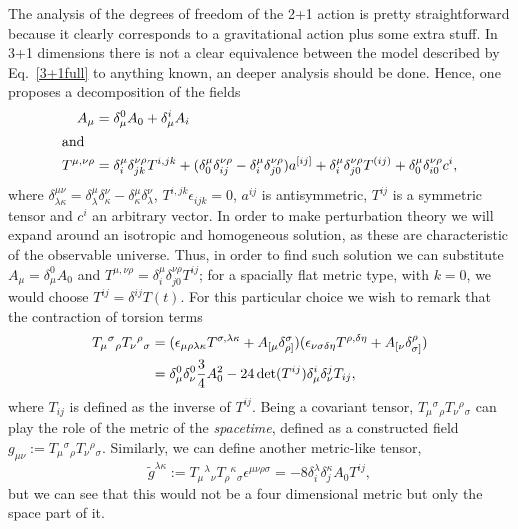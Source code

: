 \documentclass[%
  showpacs,showkeys,prd,superscriptaddress]{revtex4-1}
\begin{document}
The  analysis of the degrees of freedom of the 2+1 action is pretty straightforward because it clearly corresponds to a gravitational action plus some extra stuff. In 3+1 dimensions there is not a clear  equivalence between the model described by Eq.~\eqref{3+1full} to anything known, an deeper  analysis should be done. Hence, one proposes a decomposition of the fields
\begin{align}
  A_\mu &= \delta_\mu^0 A_0+\delta_\mu^iA_i \\
  \intertext{and }
  T^{\mu,\nu\rho} &= \delta^{\mu}_i\delta^{\nu\rho}_{jk}T^{i,jk}+(\delta^{\mu}_0\delta^{\nu\rho}_{ij}-\delta^{\mu}_i\delta^{\nu\rho}_{j0})a^{[ij]}+\delta^{\mu}_i\delta^{\nu\rho}_{j0}T^{(ij)}+\delta^{\mu}_0\delta^{\nu\rho}_{i0}c^i,
\end{align}
where $\delta^{\mu\nu}_{\lambda\kappa}=\delta^{\mu}_{\lambda}\delta^{\nu}_{\kappa}-\delta^{\mu}_{\kappa}\delta^{\nu}_{\lambda}$, $T^{i,jk}\epsilon_{ijk}=0$, $a^{ij}$ is antisymmetric, $T^{ij}$ is a symmetric tensor and $c^i$ an arbitrary vector. In order to make perturbation theory we will expand around an isotropic and homogeneous solution, as these are characteristic of the observable universe. Thus, in order to find such solution we can substitute $A_\mu=\delta_\mu^0 A_0$ and $T^{\mu,\nu\rho}=\delta^{\mu}_i\delta^{\nu\rho}_{j0}T^{ij}$; for a spacially flat metric type, with $k=0$, we would choose $T^{ij}=\delta^{ij}T(t)$. For this particular choice we wish to remark that the contraction of torsion terms
\begin{align}
  T_{\mu}{}^{\sigma}{}_\rho T_{\nu}{}^{\rho}{}_\sigma &= (\epsilon_{\mu\rho\lambda\kappa}T^{\sigma,\lambda\kappa}+A_{[\mu}\delta^\sigma_{\rho]})(\epsilon_{\nu\sigma\delta\eta}T^{\rho,\delta\eta}+A_{[\nu}\delta^\rho_{\sigma]}) \notag \\
  &= \delta^0_\mu\delta^0_\nu\frac{3}{4} A_0^2-24\det(T^{ij})\delta^i_\mu\delta^j_\nu T_{ij},
\end{align}
where $T_{ij}$ is defined as the inverse of $T^{ij}$. Being a covariant tensor, $T_{\mu}{}^{\sigma}{}_\rho T_{\nu}{}^{\rho}{}_\sigma$ can play the role of the metric of the {\it spacetime}, defined as a constructed field $g_{\mu\nu}:= T_{\mu}{}^{\sigma}{}_\rho T_{\nu}{}^{\rho}{}_\sigma $. Similarly, we can define another metric-like tensor, 
\begin{equation}
  \tilde g^{\lambda\kappa}:= T_{\mu}{}^{\lambda}{}_\nu T_{\rho}{}^{\kappa}{}_\sigma\epsilon^{\mu\nu\rho\sigma}=-8\delta^\lambda_i\delta^\kappa_jA_0T^{ij},
\end{equation}
but we can see that this would not be a four dimensional metric but only the space part of it.
\end{document}
